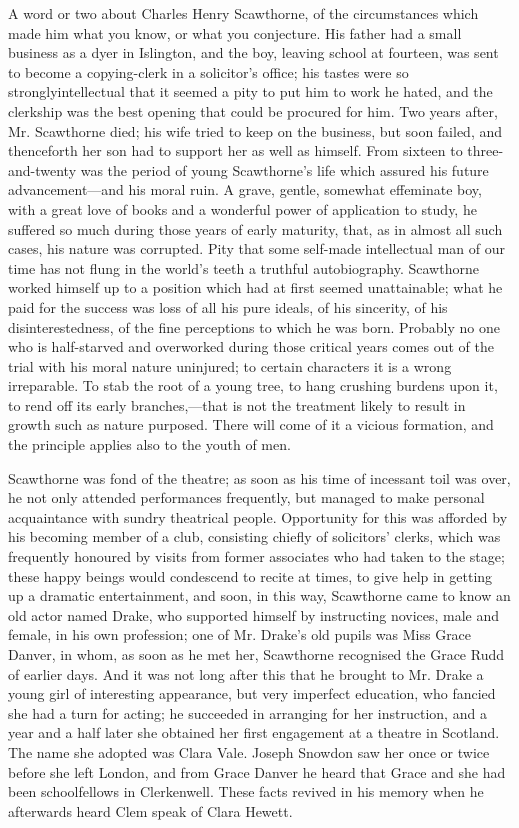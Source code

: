 A word or two about Charles Henry Scawthorne, of the circumstances which
made him what you know, or what you conjecture. His father had a small
business as a dyer in Islington, and the boy, leaving school at
fourteen, was sent to become a copying-clerk in a
{\protect\hypertarget{180}{}{}}solicitor's office; his tastes were so
stronglyintellectual that it seemed a pity to put him to work he hated,
and the clerkship was the best opening that could be procured for him.
Two years after, Mr. Scawthorne died; his wife tried to keep on the
business, but soon failed, and thenceforth her son had to support her as
well as himself. From sixteen to three-and-twenty was the period of
young Scawthorne's life which assured his future advancement---and his
moral ruin. A grave, gentle, somewhat effeminate boy, with a great love
of books and a wonderful power of application to study, he suffered so
much during those years of early maturity, that, as in almost all such
cases, his nature was corrupted. Pity that some self-made intellectual
man of our time has not flung in the world's teeth a truthful
autobiography. Scawthorne worked himself up to a position which had at
first seemed unattainable; what he paid for the success was loss of all
his pure ideals, of his sincerity, of his disinterestedness, of the fine
perceptions to which he was born.
{\protect\hypertarget{181}{}{}}Probably no one who is half-starved and
overworked during those critical years comes out of the trial with his
moral nature uninjured; to certain characters it is a wrong irreparable.
To stab the root of a young tree, to hang crushing burdens upon it, to
rend off its early branches,---that is not the treatment likely to
result in growth such as nature purposed. There will come of it a
vicious formation, and the principle applies also to the youth of men.

Scawthorne was fond of the theatre; as soon as his time of incessant
toil was over, he not only attended performances frequently, but managed
to make personal acquaintance with sundry theatrical people. Opportunity
for this was afforded by his becoming member of a club, consisting
chiefly of solicitors' clerks, which was frequently honoured by visits
from former associates who had taken to the stage; these happy beings
would condescend to recite at times, to give help in getting up a
dramatic entertainment, and soon, in this way, Scawthorne came to know
an old actor named {\protect\hypertarget{182}{}{}}Drake, who supported
himself by instructing novices, male and female, in his own profession;
one of Mr. Drake's old pupils was Miss Grace Danver, in whom, as soon as
he met her, Scawthorne recognised the Grace Rudd of earlier days. And it
was not long after this that he brought to Mr. Drake a young girl of
interesting appearance, but very imperfect education, who fancied she
had a turn for acting; he succeeded in arranging for her instruction,
and a year and a half later she obtained her first engagement at a
theatre in Scotland. The name she adopted was Clara Vale. Joseph Snowdon
saw her once or twice before she left London, and from Grace Danver he
heard that Grace and she had been schoolfellows in Clerkenwell. These
facts revived in his memory when he afterwards heard Clem speak of Clara
Hewett.

